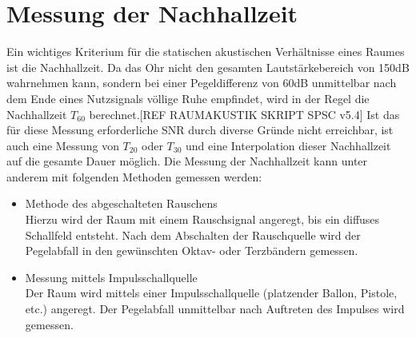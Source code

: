 \documentclass[11pt]{report}
\begin{document}


%

\newpage
\tableofcontents  

%




\listoffigures 


\pagestyle{headings}


\chapter{Messung der Nachhallzeit}
Ein wichtiges Kriterium für die statischen akustischen Verhältnisse eines Raumes ist die Nachhallzeit. Da das Ohr nicht den gesamten Lautstärkebereich von 150dB wahrnehmen kann, sondern bei einer Pegeldifferenz von 60dB unmittelbar nach dem Ende eines Nutzsignals völlige Ruhe empfindet, wird in der Regel die Nachhallzeit $T_{60}$ berechnet.[REF RAUMAKUSTIK SKRIPT SPSC v5.4]  Ist das für diese Messung erforderliche SNR durch diverse Gründe nicht erreichbar, ist auch eine Messung von $T_{20}$ oder $T_{30}$ und eine Interpolation dieser Nachhallzeit auf die gesamte Dauer möglich. Die Messung der Nachhallzeit kann unter anderem mit folgenden Methoden gemessen werden:
\begin{itemize}
\item Methode des abgeschalteten Rauschens\\
Hierzu wird der Raum mit einem Rauschsignal angeregt, bis ein diffuses Schallfeld entsteht. Nach dem Abschalten der Rauschquelle wird der Pegelabfall in den gewünschten Oktav- oder Terzbändern gemessen.
\item Messung mittels Impulsschallquelle\\
Der Raum wird mittels einer Impulsschallquelle (platzender Ballon, Pistole, etc.) angeregt. Der Pegelabfall unmittelbar nach Auftreten des Impulses wird gemessen.
\end{itemize}
\end{document}
